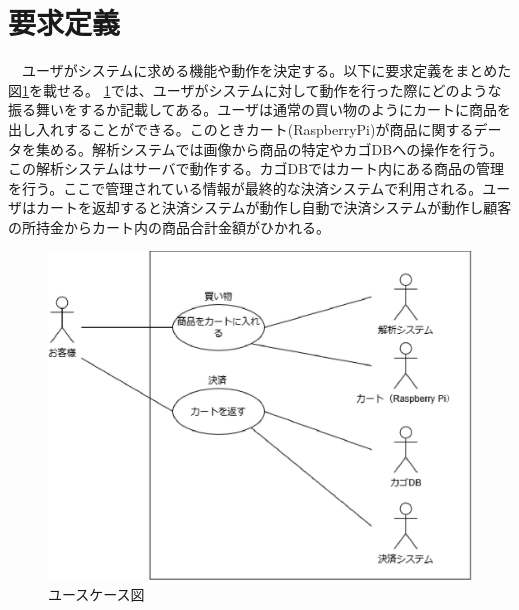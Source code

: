 \section{要求定義}
　ユーザがシステムに求める機能や動作を決定する。以下に要求定義をまとめた図\ref{usecase}を載せる。
\ref{usecase}では、ユーザがシステムに対して動作を行った際にどのような振る舞いをするか記載してある。ユーザは通常の買い物のようにカートに商品を出し入れすることができる。このときカート(RaspberryPi)が商品に関するデータを集める。解析システムでは画像から商品の特定やカゴDBへの操作を行う。この解析システムはサーバで動作する。カゴDBではカート内にある商品の管理を行う。ここで管理されている情報が最終的な決済システムで利用される。ユーザはカートを返却すると決済システムが動作し自動で決済システムが動作し顧客の所持金からカート内の商品合計金額がひかれる。

\begin{figure}[htbp]
\centering
\includegraphics[width=12cm]{./pic/usecase_saishu.eps}
\caption{ユースケース図}
\label{usecase}
\end{figure}